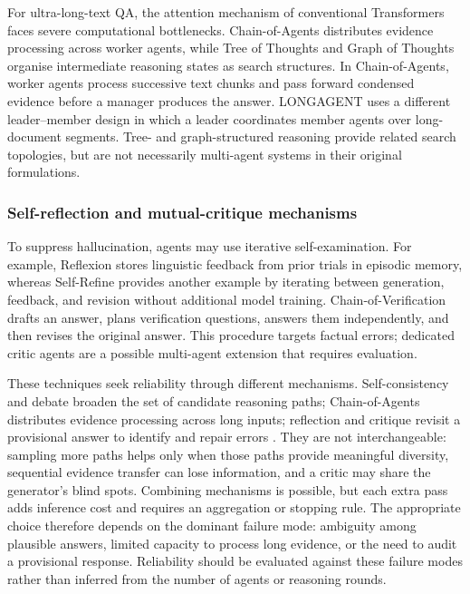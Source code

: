 \documentclass[a4paper,fleqn]{cas-dc}
\begin{document}
For ultra-long-text QA, the attention mechanism of conventional
Transformers faces severe computational bottlenecks.
Chain-of-Agents \citep{zhang2024chain_agents} distributes evidence processing
across worker agents, while Tree of Thoughts
\citep{yao2023tree_of_thoughts} and Graph of Thoughts
\citep{besta2024graph_of_thoughts} organise intermediate reasoning states as
search structures.
In Chain-of-Agents, worker agents process successive text chunks and pass
forward condensed evidence before a manager produces the answer. LONGAGENT
\citep{zhao2024longagent} uses a different leader--member design in which a
leader coordinates member agents over long-document segments. Tree- and
graph-structured reasoning provide related search topologies, but are not
necessarily multi-agent systems in their original formulations.

\subsubsection{Self-reflection and mutual-critique mechanisms}
\label{sec:reflexion}

To suppress hallucination, agents may use iterative self-examination.
For example, Reflexion \citep{shinn2023reflexion} stores linguistic feedback
from prior trials in episodic memory, whereas Self-Refine
\citep{madaan2023self_refine} provides another example by iterating between generation, feedback, and
revision without additional model training.
Chain-of-Verification \citep{dhuliawala2023chain_of_verification} drafts an
answer, plans verification questions, answers them independently, and then
revises the original answer. This procedure targets factual errors; dedicated
critic agents are a possible multi-agent extension that requires evaluation.

These techniques seek reliability through
different mechanisms. Self-consistency and debate broaden the set of candidate
reasoning paths; Chain-of-Agents distributes evidence processing across long
inputs; reflection and critique revisit a provisional answer to identify and
repair errors \citep{wang2023self_consistency,du2024multiagent_debate,
zhang2024chain_agents,shinn2023reflexion,madaan2023self_refine,
dhuliawala2023chain_of_verification}. They are not interchangeable: sampling
more paths helps only when those paths provide meaningful diversity,
sequential evidence transfer can lose information, and a critic may share the
generator's blind spots. Combining mechanisms is possible, but each extra
pass adds inference cost and requires an aggregation or stopping rule. The
appropriate choice therefore depends on the dominant failure mode: ambiguity
among plausible answers, limited capacity to process long evidence, or the
need to audit a provisional response. Reliability should be evaluated against
these failure modes rather than inferred from the number of agents or
reasoning rounds.
\end{document}
